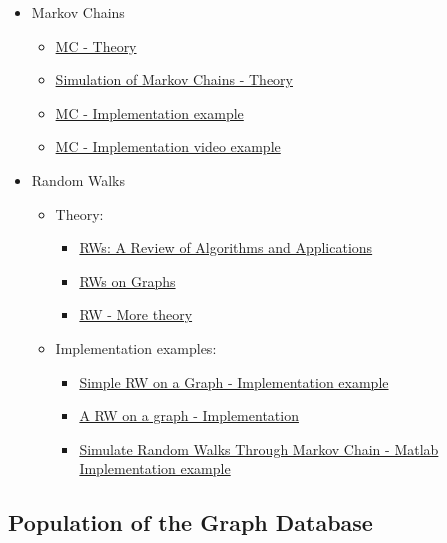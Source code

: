 \documentclass{article}
\begin{document}
\begin{itemize}
\item Markov Chains
\begin{itemize}
  \item \href{https://brilliant.org/wiki/markov-chains/}{MC - Theory}
  \item \href{https://www.columbia.edu/~ks20/4703-Sigman/4703-07-Notes-MC.pdf}{Simulation of Markov Chains - Theory}
  \item \href{https://stephens999.github.io/fiveMinuteStats/simulating_discrete_chains_1.html}{MC - Implementation example}
  \item \href{https://www.youtube.com/watch?v=G7FIQ9fXl6U}{MC - Implementation video example}
\end{itemize}
\item Random Walks
\begin{itemize}
  \item Theory:
  \begin{itemize}
    \item \href{https://ieeexplore.ieee.org/abstract/document/8911513?casa_token=vznpjKL5HG0AAAAA:hNzLCxAHBk75zCDUHsswB7ImAKgilzZcOBzxaXWz_G6U8Vy-ogbei40MoZ49M-Em5tTii0Q}{RWs: A Review of Algorithms and Applications}
    \item \href{https://www.lirmm.fr/~sau/JCALM/Josep.pdf}{RWs on Graphs}
    \item \href{https://www.fi.muni.cz/usr/gruska/random18/random1808.pdf}{RW - More theory}
  \end{itemize}
  \item Implementation examples:
  \begin{itemize}
    \item \href{https://tleise.people.amherst.edu/Math365Spring2016/RmarkdownFiles/WalkOnGraph.html}{Simple RW on a Graph - Implementation example}
    \item \href{https://graphstream-project.org/doc/Algorithms/Random-walks-on-graphs/}{A RW on a graph - Implementation}
    \item \href{https://es.mathworks.com/help/econ/simulate-random-walks-through-markov-chain.html}{Simulate Random Walks Through Markov Chain - Matlab Implementation example}
  \end{itemize}
\end{itemize}
\end{itemize}


\subsection{Population of the Graph Database}
\end{document}
